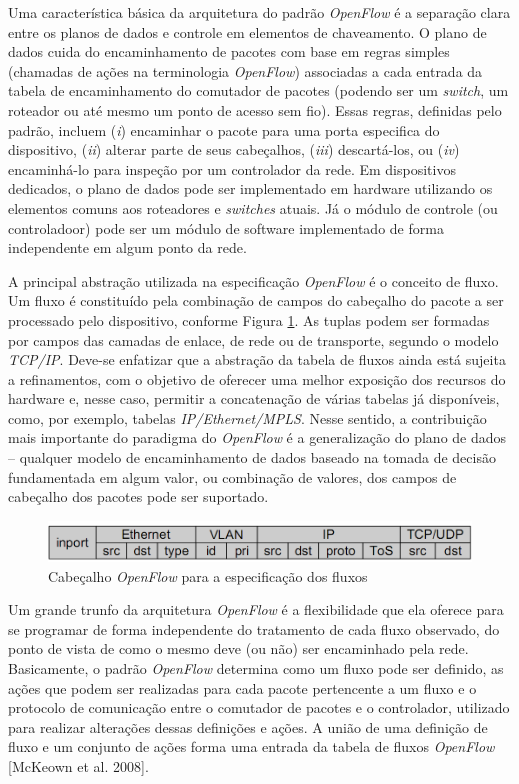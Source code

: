 Uma característica básica da arquitetura do padrão \textit{OpenFlow} 
é a separação clara entre os planos de dados e controle em
elementos de chaveamento. O plano de dados cuida do 
encaminhamento de pacotes com base em regras simples (chamadas de ações 
na terminologia \textit{OpenFlow}) associadas
a cada entrada da tabela de encaminhamento do comutador 
de pacotes (podendo ser um \textit{switch}, um roteador 
ou até mesmo um ponto de acesso sem fio).
Essas regras, definidas pelo padrão, incluem (\textit{i}) 
encaminhar o pacote para uma porta especifica do dispositivo,
(\textit{ii}) alterar parte de seus cabeçalhos, (\textit{iii}) 
descartá-los, ou (\textit{iv}) encaminhá-lo para inspeção 
por um controlador da rede. Em dispositivos dedicados, o plano
de dados pode ser implementado em hardware utilizando os
elementos comuns aos roteadores e \textit{switches} atuais.
Já o módulo de controle (ou controladoor) pode ser um 
módulo de software implementado de forma independente em
algum ponto da rede.

A principal abstração utilizada na especificação
\textit{OpenFlow} é o conceito
de fluxo. Um fluxo é constituído pela combinação de campos
do cabeçalho do pacote a ser processado pelo dispositivo,
conforme Figura \ref{fig:cabecalhoOpenflow}. As tuplas podem
ser formadas por campos das camadas de enlace, de rede ou de
transporte, segundo o modelo \textit{TCP/IP}. Deve-se
enfatizar que a abstração da tabela de fluxos ainda está sujeita a
refinamentos, com o objetivo de oferecer uma melhor
exposição dos recursos do hardware e, nesse caso, permitir a
concatenação de várias tabelas já disponíveis, como, por
exemplo, tabelas \textit{IP/Ethernet/MPLS}. Nesse sentido, a
contribuição mais importante do paradigma do
\textit{OpenFlow} é a generalização do plano
de dados – qualquer modelo de encaminhamento de dados
baseado na tomada de decisão fundamentada em algum valor, ou
combinação de valores, dos campos de cabeçalho dos pacotes
pode ser suportado.

\begin{figure}[hb] \centering
\includegraphics[width=160mm]{cabecalhoOpenflow.png}
\caption{Cabeçalho \textit{OpenFlow} para a especificação dos fluxos}
\label{fig:cabecalhoOpenflow}
\end{figure}

Um grande trunfo da arquitetura \textit{OpenFlow} é a flexibilidade 
que ela oferece para se programar de forma independente do
tratamento de cada fluxo observado, do ponto de vista de como
o mesmo deve (ou não) ser encaminhado pela rede. Basicamente,
o padrão \textit{OpenFlow} determina como um fluxo pode ser definido,
as ações que podem ser realizadas para cada pacote pertencente
a um fluxo e o protocolo de comunicação entre o comutador de 
pacotes e o controlador, utilizado para realizar alterações dessas 
definições e ações. A união de uma definição de fluxo e um
conjunto de ações forma uma entrada da tabela de fluxos 
\textit{OpenFlow} [McKeown et al. 2008].


